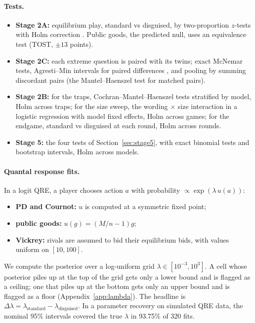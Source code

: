 \documentclass[10pt]{article}
\theoremstyle{definition}
\theoremstyle{remark}
\newcommand{\lam}{\lambda}
\begin{document}
\paragraph{Tests.}
\begin{itemize}
\item \textbf{Stage 2A:} equilibrium play, standard vs disguised, by two-proportion $z$-tests with
  Holm correction \citep{holm1979}. Public goods, the predicted null, uses an equivalence test
  (TOST, $\pm13$ points).
\item \textbf{Stage 2C:} each extreme question is paired with its twins; exact McNemar tests,
  Agresti--Min intervals for paired differences \citep{agresti2005matched}, and pooling by
  summing discordant pairs (the Mantel--Haenszel test for matched pairs).
\item \textbf{Stage 2B:} for the traps, Cochran--Mantel--Haenszel tests stratified by model,
  Holm across traps; for the size sweep, the wording $\times$ size interaction in a logistic
  regression with model fixed effects, Holm across games; for the endgame, standard vs disguised
  at each round, Holm across rounds.
\item \textbf{Stage 5:} the four tests of Section~\ref{sec:stage5}, with exact binomial tests and
  bootstrap intervals, Holm across models.
\end{itemize}

\paragraph{Quantal response fits.} In a logit QRE, a player chooses action $a$ with probability
$\propto \exp(\lam\,u(a))$:
\begin{itemize}
\item \textbf{PD and Cournot:} $u$ is computed at a symmetric fixed point;
\item \textbf{public goods:} $u(g) = (M/n-1)g$;
\item \textbf{Vickrey:} rivals are assumed to bid their equilibrium bids, with values uniform
  on $[10,100]$.
\end{itemize}
We compute the posterior over a log-uniform grid $\lam \in [10^{-3},10^3]$. A cell whose posterior
piles up at the top of the grid gets only a lower bound and is flagged as a ceiling; one that
piles up at the bottom gets only an upper bound and is flagged as a floor
(Appendix~\ref{app:lambda}).
The headline is $\Delta\lam = \lam_{\text{standard}} - \lam_{\text{disguised}}$. In a parameter
recovery on simulated QRE data, the nominal 95\% intervals covered the true $\lam$ in 93.75\% of
320 fits.
\end{document}
